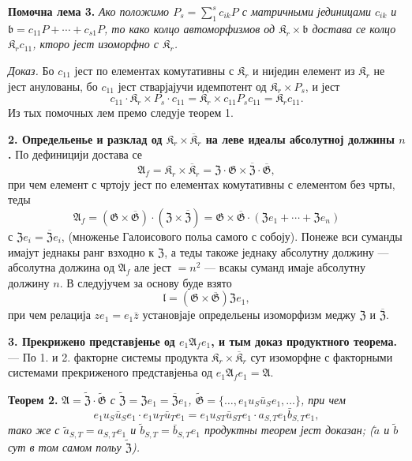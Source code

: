 \documentclass[11pt]{article}
\begin{document}
\noindent\textbf{Помочна лема 3.} \emph{Ако положимо \(P_s=\sum_1^s c_{ik}P\) с матричными јединицами \(c_{ik}\) и \(\mathfrak b=c_{11}P+\cdots+c_{s1}P\), то како колцо автоморфизмов од \(\mathfrak K_r\times\mathfrak b\) достава се колцо \(\mathfrak K_rc_{11}\), кторо јест изоморфно с \(\mathfrak K_r\).}

\noindent\emph{Доказ.} Бо \(c_{11}\) јест по елементах комутативны с \(\mathfrak K_r\) и ниједин елемент из \(\mathfrak K_r\) не јест анулованы, бо \(c_{11}\) јест стварјајучи идемпотент од \(\mathfrak K_r\times P_s\), и јест
\[
c_{11}\cdot\mathfrak K_r\times P_s\cdot c_{11}
=\mathfrak K_r\times c_{11}P_sc_{11}
=\mathfrak K_rc_{11}.
\]
Из тых помочных лем премо следује теорем 1.

\noindent\textbf{2. Определьенье и разклад од \(\mathfrak K_r\times\overline{\mathfrak K}_r\) на леве идеалы абсолутној должины \(n\).} По дефиницији достава се
\[
\mathfrak A_f=\mathfrak K_r\times\overline{\mathfrak K}_r
=\mathfrak Z\cdot\mathfrak G\times\overline{\mathfrak Z}\cdot\overline{\mathfrak G},
\]
при чем елемент с чртоју јест по елементах комутативны с елементом без чрты, теды
\[
\mathfrak A_f
=(\mathfrak G\times\overline{\mathfrak G})\cdot(\mathfrak Z\times\overline{\mathfrak Z})
=\mathfrak G\times\overline{\mathfrak G}\cdot(\mathfrak Ze_1+\cdots+\mathfrak Ze_n)
\]
с \(\mathfrak Ze_i=\overline{\mathfrak Z}e_i\), (множенье Галоисового польа самого с собоју). Понеже вси суманды имајут једнакы ранг взходно к \(\mathfrak Z\), а теды такоже једнаку абсолутну должину --- абсолутна должина од \(\mathfrak A_f\) але јест \(=n^2\) --- всакы суманд имаје абсолутну должину \(n\). В следујучем за основу буде взято
\[
\mathfrak l=(\mathfrak G\times\overline{\mathfrak G})\mathfrak Ze_1,
\]
при чем релација \(ze_1=e_1\bar z\) установјаје определьены изоморфизм меджу \(\mathfrak Z\) и \(\overline{\mathfrak Z}\).

\noindent\textbf{3. Прекрижено представјенье од \(e_1\mathfrak A_fe_1\), и тым доказ продуктного теорема.} --- По 1. и 2. факторне системы продукта \(\mathfrak K_r\times\overline{\mathfrak K}_r\) сут изоморфне с факторными системами прекриженого представјеньа од \(e_1\mathfrak A_fe_1=\mathfrak A\).

\noindent\textbf{Теорем 2.} \emph{\(\mathfrak A=\widetilde{\mathfrak Z}\cdot\widetilde{\mathfrak G}\) с \(\widetilde{\mathfrak Z}=\mathfrak Ze_1=\overline{\mathfrak Z}e_1\), \(\widetilde{\mathfrak G}=\{\ldots,e_1u_S\bar u_Se_1,\ldots\}\), при чем
\[
e_1u_S\bar u_Se_1\cdot e_1u_T\bar u_Te_1
=e_1u_{ST}\bar u_{ST}e_1\cdot a_{S,T}e_1\bar b_{S,T}e_1,
\]
тако же с \(\tilde a_{S,T}=a_{S,T}e_1\) и \(\tilde b_{S,T}=\bar b_{S,T}e_1\) продуктны теорем јест доказан; (\(\tilde a\) и \(\tilde b\) сут в том самом польу \(\widetilde{\mathfrak Z}\)).}
\end{document}
